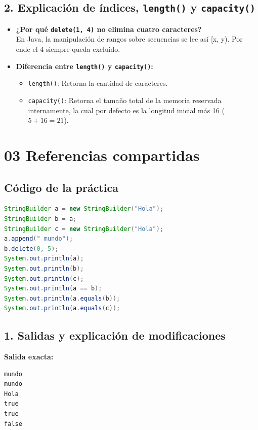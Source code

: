 \documentclass{article}
\begin{document}
\subsection*{2. Explicación de índices, \texttt{length()} y \texttt{capacity()}}
\begin{itemize}
    \item \textbf{¿Por qué \texttt{delete(1, 4)} no elimina cuatro caracteres?} \\
    En Java, la manipulación de rangos sobre secuencias se lee así [x, y). Por ende el 4 siempre queda excluido.
    \item \textbf{Diferencia entre \texttt{length()} y \texttt{capacity()}:}
    \begin{itemize}
        \item \texttt{length()}: Retorna la cantidad de caracteres.
        \item \texttt{capacity()}: Retorna el tamaño total de la memoria reservada internamente, la cual por defecto es la longitud inicial más 16 ($5 + 16 = 21$).
    \end{itemize}
\end{itemize}

\newpage

\section*{03 Referencias compartidas}

\subsection*{Código de la práctica}
\begin{lstlisting}[language=Java]
StringBuilder a = new StringBuilder("Hola");
StringBuilder b = a;
StringBuilder c = new StringBuilder("Hola");
a.append(" mundo");
b.delete(0, 5);
System.out.println(a);
System.out.println(b);
System.out.println(c);
System.out.println(a == b);
System.out.println(a.equals(b));
System.out.println(a.equals(c));
\end{lstlisting}

\subsection*{1. Salidas y explicación de modificaciones}
\textbf{Salida exacta:}
\begin{verbatim}
mundo
mundo
Hola
true
true
false
\end{verbatim}
\end{document}
